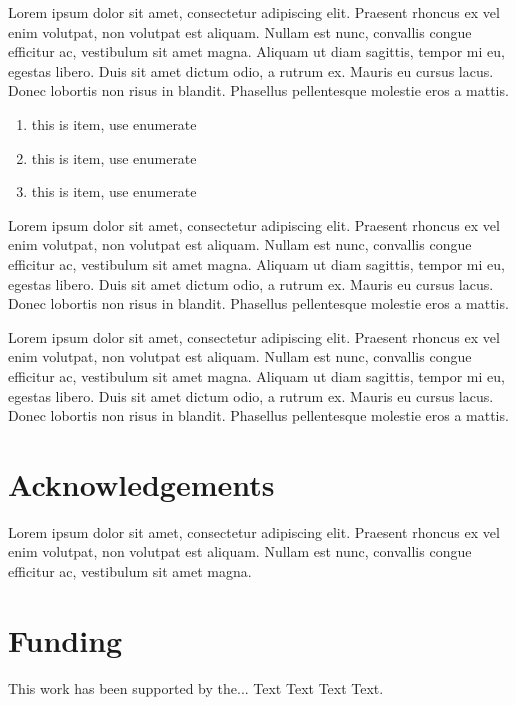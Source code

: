 \documentclass{bioinfo}
\begin{document}
Lorem ipsum dolor sit amet, consectetur adipiscing elit. Praesent 
rhoncus ex vel enim volutpat, non volutpat est aliquam. Nullam est 
nunc, convallis congue efficitur ac, vestibulum sit amet magna. 
Aliquam ut diam sagittis, tempor mi eu, egestas libero. Duis sit 
amet dictum odio, a rutrum ex. Mauris eu cursus lacus. Donec 
lobortis non risus in blandit. Phasellus pellentesque molestie 
eros a mattis.

\begin{enumerate}
\item this is item, use enumerate
\item this is item, use enumerate
\item this is item, use enumerate
\end{enumerate}

Lorem ipsum dolor sit amet, consectetur adipiscing elit. Praesent 
rhoncus ex vel enim volutpat, non volutpat est aliquam. Nullam est 
nunc, convallis congue efficitur ac, vestibulum sit amet magna. 
Aliquam ut diam sagittis, tempor mi eu, egestas libero. Duis sit 
amet dictum odio, a rutrum ex. Mauris eu cursus lacus. Donec 
lobortis non risus in blandit. Phasellus pellentesque molestie 
eros a mattis. 


Lorem ipsum dolor sit amet, consectetur adipiscing elit. Praesent 
rhoncus ex vel enim volutpat, non volutpat est aliquam. Nullam est 
nunc, convallis congue efficitur ac, vestibulum sit amet magna. 
Aliquam ut diam sagittis, tempor mi eu, egestas libero. Duis sit 
amet dictum odio, a rutrum ex. Mauris eu cursus lacus. Donec 
lobortis non risus in blandit. Phasellus pellentesque molestie 
eros a mattis. 


\section*{Acknowledgements}

Lorem ipsum dolor sit amet, consectetur adipiscing elit. Praesent 
rhoncus ex vel enim volutpat, non volutpat est aliquam. Nullam est 
nunc, convallis congue efficitur ac, vestibulum sit amet magna.
\vspace*{-12pt}

\section*{Funding}

This work has been supported by the... Text Text  Text Text.\vspace*{-12pt}
\end{document}
